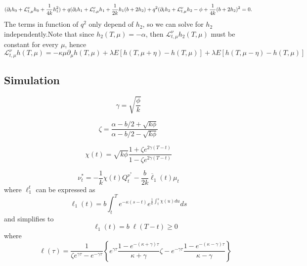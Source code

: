 \begin{displaymath}
	(\partial_t h_0 + \mathcal L ^\nu_{t,\mu} h_0 + \frac{1}{4k} h_1^2 ) + \\
	q(\partial_t h_1 + \mathcal L ^\nu_{t,\mu} h_1 + \frac{1}{2k} h_1(b+2h_2) + \\
	q^2(\partial_t h_2 + \mathcal L ^\nu_{t,\mu} h_2 -\phi + \frac{1}{4k}(b+2h_2)^2 =0.
\end{displaymath}
The terms in function of $q^2$ only depend of $h_2$, so we can solve for $h_2$ independently.Note that since $h_2(T,\mu) = -\alpha$, then $\mathcal L ^\nu_{t,\mu}h_2(T,\mu)$ must be constant for every $\mu$, hence
\begin{displaymath}
	\mathcal L^\nu_{t,\mu} h(T,\mu) = -\kappa \mu \partial_\mu h(T,\mu) +
	\lambda E[ h(T,\mu+\eta) - h(T,\mu)] +
	\lambda E[ h(T,\mu-\eta) - h(T,\mu)]
\end{displaymath}

\subsection{Simulation}

\begin{displaymath}
	\gamma = \sqrt{\frac{\phi}{k}}
\end{displaymath}

\begin{displaymath}
	\zeta = \frac{\alpha -b/2 + \sqrt{k \phi}}{\alpha -b/2 - \sqrt{k \phi}}
\end{displaymath}

\begin{displaymath}
	\chi(t) = \sqrt{k \phi} \frac{1+\zeta e^{2\gamma(T-t)}}{1-\zeta e^{2\gamma(T-t)}}
\end{displaymath}

\begin{displaymath}
	\nu_{t}^{*}=-\frac{1}{k} \chi(t) Q_{t}^{\nu^{*}}-\frac{b}{2 k} \overline{\ell}_{1}(t) \mu_{t}
\end{displaymath}
where $\ell_{1}^{t}$ can be expressed as
\begin{displaymath}
	\ell_{1}(t)=b \int_{t}^{T} e^{-\kappa(s-t)} e^{\frac{1}{k} \int_{t}^{s}\chi(u) d u}  d s
\end{displaymath}
and  simplifies to
\begin{displaymath}
	{\qquad \ell_{1}(t)=b \;\ell(T-t) \geq 0}
\end{displaymath}
where
\begin{displaymath}
	{\qquad \ell(\tau)=\frac{1}{\zeta e^{\gamma \tau}-e^{-\gamma \tau}}\left\{e^{\gamma \tau} \frac{1-e^{-(\kappa+\gamma) \tau}}{\kappa+\gamma} \zeta-e^{-\gamma \tau} \frac{1-e^{-(\kappa-\gamma) \tau}}{\kappa-\gamma}\right\}}
\end{displaymath}

